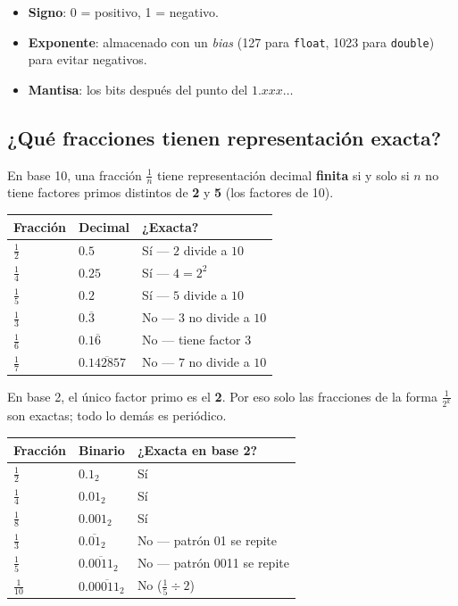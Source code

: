 \documentclass[12pt, oneside]{article}
\begin{document}
\begin{itemize}
  \item \textbf{Signo}: 0 = positivo, 1 = negativo.
  \item \textbf{Exponente}: almacenado con un \textit{bias} (127 para
        \texttt{float}, 1023 para \texttt{double}) para evitar negativos.
  \item \textbf{Mantisa}: los bits después del punto del $1.xxx\ldots$
\end{itemize}

\subsection{¿Qué fracciones tienen representación exacta?}

En base 10, una fracción $\frac{1}{n}$ tiene representación decimal
\textbf{finita} si y solo si $n$ no tiene factores primos distintos de
\textbf{2} y \textbf{5} (los factores de 10).

\begin{center}
\begin{tabular}{lll}
  \toprule
  \textbf{Fracción} & \textbf{Decimal} & \textbf{¿Exacta?} \\
  \midrule
  $\frac{1}{2}$ & $0.5$               & Sí — $2$ divide a $10$ \\
  $\frac{1}{4}$ & $0.25$              & Sí — $4 = 2^2$ \\
  $\frac{1}{5}$ & $0.2$               & Sí — $5$ divide a $10$ \\
  $\frac{1}{3}$ & $0.\overline{3}$    & No — $3$ no divide a $10$ \\
  $\frac{1}{6}$ & $0.1\overline{6}$   & No — tiene factor $3$ \\
  $\frac{1}{7}$ & $0.\overline{142857}$ & No — $7$ no divide a $10$ \\
  \bottomrule
\end{tabular}
\end{center}

En base 2, el único factor primo es el \textbf{2}.
Por eso solo las fracciones de la forma $\frac{1}{2^k}$ son exactas;
todo lo demás es periódico.

\begin{center}
\begin{tabular}{lll}
  \toprule
  \textbf{Fracción} & \textbf{Binario} & \textbf{¿Exacta en base 2?} \\
  \midrule
  $\frac{1}{2}$ & $0.1_2$                   & Sí \\
  $\frac{1}{4}$ & $0.01_2$                  & Sí \\
  $\frac{1}{8}$ & $0.001_2$                 & Sí \\
  $\frac{1}{3}$ & $0.\overline{01}_2$        & No — patrón 01 se repite \\
  $\frac{1}{5}$ & $0.\overline{0011}_2$      & No — patrón 0011 se repite \\
  $\frac{1}{10}$& $0.0\overline{0011}_2$     & No ($\frac{1}{5}\div 2$) \\
  \bottomrule
\end{tabular}
\end{center}
\end{document}

